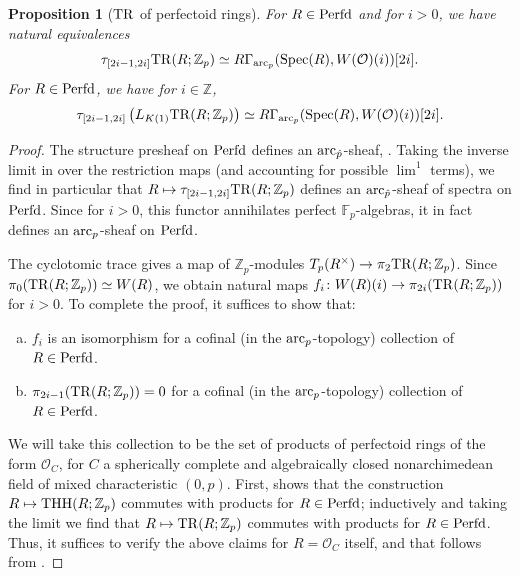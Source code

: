 \documentclass{amsart}
\newtheorem{proposition}[theorem]{Proposition}
\theoremstyle{definition}
\newcommand{\spec}{\mathrm{Spec}}
\begin{document}
\begin{proposition}[$\mathrm{TR}$ of perfectoid rings] 
\label{TRofperfectoid}
For $R \in \mathrm{Perfd}$ and for $i > 0$, we have natural equivalences
\begin{equation} \tau_{[2i-1, 2i]} \TR(R; \mathbb{Z}_p) \simeq 
R \Gamma_{\arc}( \spec(R), W(\mathcal{O})(i))[2i].
\end{equation}
For $R \in \mathrm{Perfd}$, we have 
for $i \in \mathbb{Z}$,
\begin{equation} \label{TRpieces}   \tau_{[2i-1, 2i]} \left( L_{K(1)}\TR(R; \mathbb{Z}_p) \right) \simeq 
R \Gamma_{\arc}( \spec(R), W(\mathcal{O})(i))[2i] . \end{equation}
\end{proposition} 
\begin{proof} 
The structure presheaf on $\mathrm{Perfd}$ defines an $\mathrm{arc}_{\hat{p}}$-sheaf,
\cite[Prop.~8.9]{Prisms}.  
Taking the inverse limit in  over the restriction maps (and accounting for possible $\lim^1$ terms),
we find in particular that 
$R \mapsto \tau_{[2i-1, 2i]} \mathrm{TR}(R; \mathbb{Z}_p)$ defines an
$\mathrm{arc}_{\hat{p}}$-sheaf of spectra on $\mathrm{Perfd}$. 
Since for $i > 0$, this functor annihilates perfect $\mathbb{F}_p$-algebras, 
it in fact defines an $\mathrm{arc}_{{p}}$-sheaf on $\mathrm{Perfd}$. 


The cyclotomic trace gives a map 
of $\mathbb{Z}_p$-modules
$T_p( R^{\times}) \to \pi_2 \mathrm{TR}(R; \mathbb{Z}_p)$. 
Since $\pi_0( \mathrm{TR}(R; \mathbb{Z}_p) ) \simeq W(R)$, we obtain natural maps 
$f_i \colon W(R) (i)\to  \pi_{2i}( \mathrm{TR}(R; \mathbb{Z}_p))$ for $i > 0$. To complete the proof, it
suffices to show that: 

\begin{enumerate}[a)]
\item  
$f_i$ is an isomorphism for a cofinal (in the $\mathrm{arc}_{{p}}$-topology) collection of $R \in \mathrm{Perfd}$. 
\item
$\pi_{2i-1}( \mathrm{TR}(R; \mathbb{Z}_p)) =0 $ for a cofinal (in the
$\mathrm{arc}_{{p}}$-topology) collection of $R \in
\mathrm{Perfd}$. 
\end{enumerate}

We will take this collection to be the set of products of perfectoid rings of
the form $\mathcal{O}_C$, for $C$ a spherically complete and algebraically
closed  nonarchimedean field of mixed characteristic $(0, p)$. 
First,  shows that the construction $R \mapsto \mathrm{THH}(R;
\mathbb{Z}_p)$ commutes with products for $R \in \mathrm{Perfd}$; inductively and taking
the limit we find that $R \mapsto \mathrm{TR}(R; \mathbb{Z}_p)$ commutes with products
for $R \in \mathrm{Perfd}$. 
Thus, it suffices to verify the above claims for $R = \mathcal{O}_C$ itself,
and that follows from . 




\end{proof}
\end{document}

